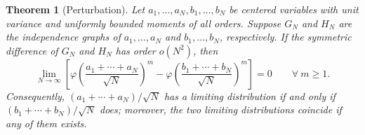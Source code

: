\documentclass[a4paper,12pt]{extarticle}
\newtheorem{thm}{Theorem}[section]
\theoremstyle{definition}
\theoremstyle{remark}
\begin{document}
\begin{thm}[Perturbation]\label{thm_perturbation}
	Let $a_1,\ldots,a_N,b_1,\ldots,b_N$ be centered variables with unit variance and uniformly bounded moments of all orders. 
	Suppose $G_N$ and $H_N$ are the independence graphs of $a_1,\ldots,a_N$ and $b_1,\ldots,b_N$, respectively. 
	If the symmetric difference of $G_N$ and $H_N$ has order $o(N^2)$, then 
	\[
	\lim_{N \to \infty} \left[ \varphi	\left( \frac{a_1 + \cdots + a_N}{\sqrt{N}} \right)^m - 
	\varphi	\left( \frac{b_1 + \cdots + b_N}{\sqrt{N}} \right)^m  \right]
	=  0 
	\qquad \forall \ m \geq 1.
	\]
	Consequently, $(a_1 + \cdots + a_N)/\sqrt{N}$ has a limiting distribution if and only if $(b_1 + \cdots + b_N)/\sqrt{N}$ does; moreover, the two limiting distributions coincide if any of them exists. 
\end{thm}
\end{document}
